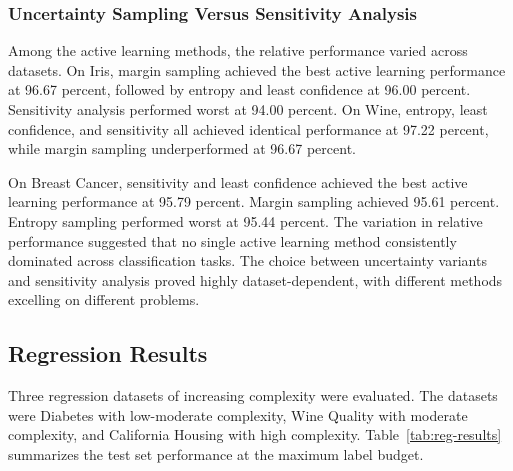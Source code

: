\documentclass[conference]{IEEEtran}
\begin{document}
\subsubsection{Uncertainty Sampling Versus Sensitivity Analysis}

Among the active learning methods, the relative performance varied across datasets. On Iris, margin sampling achieved the best active learning performance at 96.67 percent, followed by entropy and least confidence at 96.00 percent. Sensitivity analysis performed worst at 94.00 percent. On Wine, entropy, least confidence, and sensitivity all achieved identical performance at 97.22 percent, while margin sampling underperformed at 96.67 percent.

On Breast Cancer, sensitivity and least confidence achieved the best active learning performance at 95.79 percent. Margin sampling achieved 95.61 percent. Entropy sampling performed worst at 95.44 percent. The variation in relative performance suggested that no single active learning method consistently dominated across classification tasks. The choice between uncertainty variants and sensitivity analysis proved highly dataset-dependent, with different methods excelling on different problems.

\subsection{Regression Results}

Three regression datasets of increasing complexity were evaluated. The datasets were Diabetes with low-moderate complexity, Wine Quality with moderate complexity, and California Housing with high complexity. Table~\ref{tab:reg-results} summarizes the test set performance at the maximum label budget.
\end{document}
